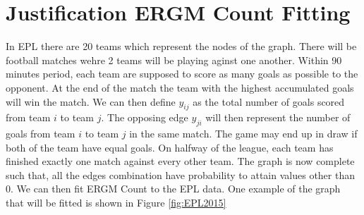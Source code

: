 \documentclass[12pt,a4paper,twoside,openany]{book}\usepackage[]{graphicx}\usepackage[]{color}
\begin{document}
\section{Justification ERGM Count Fitting}

In EPL there are 20 teams which represent the nodes of the graph. There will be football matches wehre 2 teams will be playing aginst one another. 
Within 90 minutes period, each team are supposed to score as many goals as possible to the opponent.
At the end of the match the team with the highest accumulated goals will win the match. 
We can then define $y_{ij}$ as the total number of goals scored from team $i$ to team $j$.
The opposing edge $y_{ji}$ will then represent the number of goals from team $i$ to team $j$ in the same match. 
The game may end up in draw if both of the team have equal goals.
On halfway of the league, each team has finished exactly one match against every other team. 
The graph is now complete such that, all the edges combination have probability to attain values other than 0. 
We can then fit ERGM Count to the EPL data.
One example of the graph that will be fitted is shown in Figure \ref{fig:EPL2015}
\end{document}
